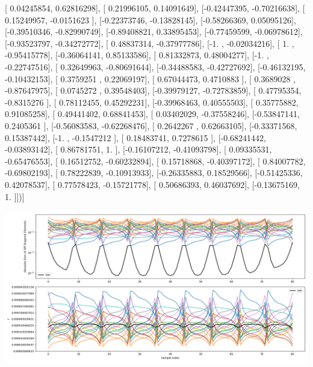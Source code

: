 \documentclass{article}
\begin{document}
       [ 0.04245854,  0.62816298],
       [ 0.21996105,  0.14091649],
       [-0.42447395, -0.70216638],
       [ 0.15249957, -0.0151623 ],
       [-0.22373746, -0.13828145],
       [-0.58266369,  0.05095126],
       [-0.39510346, -0.82990749],
       [-0.89408821,  0.33895453],
       [-0.77459599, -0.06978612],
       [-0.93523797, -0.34272772],
       [ 0.48837314, -0.37977786],
       [-1.        , -0.02034216],
       [ 1.        , -0.95415778],
       [-0.36064141,  0.85133586],
       [ 0.81332873,  0.48004277],
       [-1.        , -0.22747516],
       [ 0.32649963, -0.80691644],
       [-0.34488583, -0.42727692],
       [-0.46132195, -0.10432153],
       [ 0.3759251 ,  0.22069197],
       [ 0.67044473,  0.4710883 ],
       [ 0.3689028 , -0.87647975],
       [ 0.0745272 ,  0.39548403],
       [-0.39979127, -0.72783859],
       [ 0.47795354, -0.8315276 ],
       [ 0.78112455,  0.45292231],
       [-0.39968463,  0.40555503],
       [ 0.35775882,  0.91085258],
       [ 0.49441402,  0.68841453],
       [ 0.03402029, -0.37558246],
       [-0.53847141,  0.2405361 ],
       [-0.56083583, -0.62268476],
       [ 0.2642267 ,  0.62663105],
       [-0.33371568,  0.15387442],
       [-1.        , -0.1547212 ],
       [ 0.18483741,  0.7278615 ],
       [-0.68241442, -0.03893142],
       [ 0.86781751,  1.        ],
       [-0.16107212, -0.41093798],
       [ 0.09335531, -0.65476553],
       [ 0.16512752, -0.60232894],
       [ 0.15718868, -0.40397172],
       [ 0.84007782, -0.69802193],
       [ 0.78222839, -0.10913933],
       [-0.26335883,  0.18529566],
       [-0.51425336,  0.42078537],
       [ 0.77578423, -0.15721778],
       [ 0.50686393,  0.46037692],
       [-0.13675169,  1.        ]])]
\begin{center}
\includegraphics[scale=.9]{report_pickled_controls228/control_dpn_all.png}

\end{center}
\end{document}
